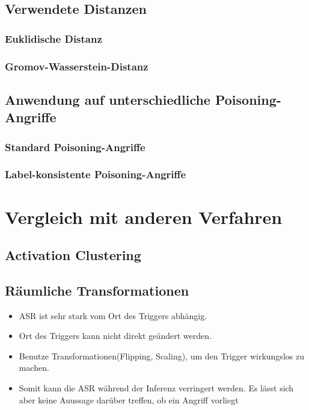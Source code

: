 \documentclass{article}
\theoremstyle{break}
\begin{document}
	\subsection{Verwendete Distanzen}
	\subsubsection{Euklidische Distanz}
	\subsubsection{Gromov-Wasserstein-Distanz}
	\subsection{Anwendung auf unterschiedliche Poisoning-Angriffe}	\subsubsection{Standard Poisoning-Angriffe}
	\subsubsection{Label-konsistente Poisoning-Angriffe}
	\section{Vergleich mit anderen Verfahren}
	\subsection{Activation Clustering}
	\subsection{Räumliche Transformationen}
	\begin{itemize}
		\item ASR ist sehr stark vom Ort des Triggers abhängig.
		\item Ort des Triggers kann nicht direkt geändert werden.
		\item Benutze Transformationen(Flipping, Scaling), um den Trigger wirkungslos zu machen.
		\item Somit kann die ASR während der Inferenz verringert werden. Es lässt sich aber keine Auussage darüber treffen, ob ein Angriff vorliegt
	\end{itemize}
	
\end{document}
